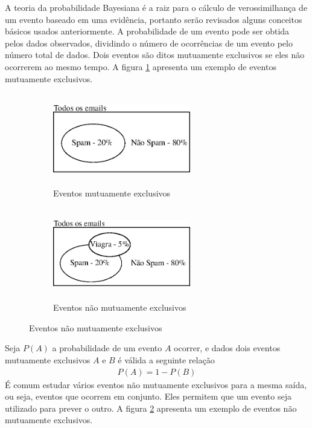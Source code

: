 A teoria da probabilidade Bayesiana é a raiz para o cálculo de verossimilhança de um evento baseado em uma evidência, portanto serão revisados alguns conceitos básicos usados anteriormente. A probabilidade de um evento pode ser obtida pelos dados observados, dividindo o número de ocorrências de um evento pelo número total de dados. Dois eventos são ditos mutuamente exclusivos se eles não ocorrerem ao mesmo tempo. A figura \ref{fig:FIGURA_EVENTOS_MUTUAMENTE_EXCLUSIVOS} apresenta um exemplo de eventos mutuamente exclusivos.
\begin{figure}[!hbt]
\centering
\caption{Tipos de eventos probabilísticos}
\begin{subfigure}{.5\textwidth}
  \centering
  \includegraphics[width=6cm, height=4cm]{./secoes/conceitosFundamentais/pics/img/EventosMutuamenteExclusivos.eps}
  \caption{Eventos mutuamente exclusivos}
  \label{fig:FIGURA_EVENTOS_MUTUAMENTE_EXCLUSIVOS}
\end{subfigure}%
\begin{subfigure}{.5\textwidth}
  \centering
  \includegraphics[width=6cm, height=4cm]{./secoes/conceitosFundamentais/pics/img/EventosNaoMutuamenteExclusivos.eps}
  \caption{Eventos não mutuamente exclusivos}
  \label{fig:FIGURA_EVENTOS_NAO_MUTUAMENTE_EXCLUSIVOS}
\end{subfigure}
\label{fig}
\vspace{0.1cm}
\end{figure}
Seja \(P(A)\) a probabilidade de um evento \(A\) ocorrer, e dados dois eventos mutuamente exclusivos \(A\) e \(B\) é válida a seguinte relação
\begin{align}
P(A) = 1 - P(B)
\end{align}
É comum estudar vários eventos não mutuamente exclusivos para a mesma saída, ou seja, eventos que ocorrem em conjunto. Eles permitem que um evento seja utilizado para prever o outro. A figura \ref{fig:FIGURA_EVENTOS_NAO_MUTUAMENTE_EXCLUSIVOS} apresenta um exemplo de eventos não mutuamente exclusivos.


